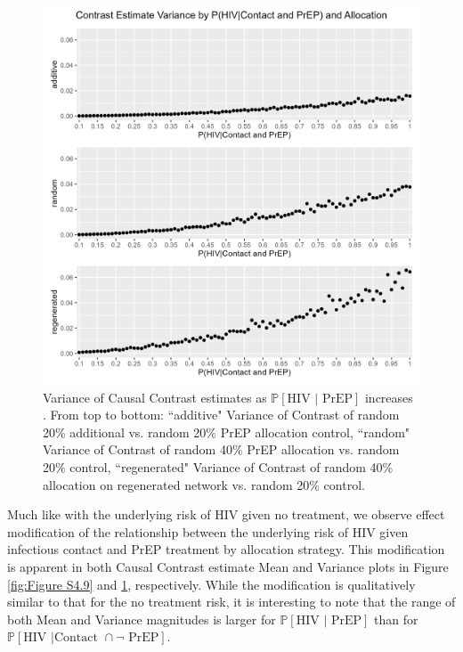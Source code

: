 \documentclass{article}
\theoremstyle{definition}
\begin{document}
\begin{figure}[H]
    \centering
    \includegraphics[width=\linewidth]{Figures/p2 Variance plots.png}
    \caption{Variance of Causal Contrast estimates as $\mathbb{P}\left[\text{HIV } \vert \text{ PrEP}\right]$ increases .  From top to bottom: ``additive" Variance of Contrast of random 20\% additional vs. random 20\% PrEP allocation control, ``random" Variance of Contrast of random 40\% PrEP allocation vs. random 20\% control, ``regenerated" Variance of Contrast of random 40\% allocation on regenerated network vs. random 20\% control.}
    \label{fig:Figure S4.10}
\end{figure}
Much like with the underlying risk of HIV given no treatment, we observe effect modification of the relationship between the underlying risk of HIV given infectious contact and PrEP treatment by allocation strategy. This modification is apparent in both Causal Contrast estimate Mean and Variance plots in Figure \ref{fig:Figure S4.9} and \ref{fig:Figure S4.10}, respectively. While the modification is qualitatively similar to that for the no treatment risk, it is interesting to note that the range of both Mean and Variance magnitudes is larger for $\mathbb{P}\left[\text{HIV } \vert \text{ PrEP}\right]$ than for $\mathbb{P}\left[\text{HIV } \vert \text {Contact } \cap \neg \text{ PrEP}\right]$.
\end{document}
